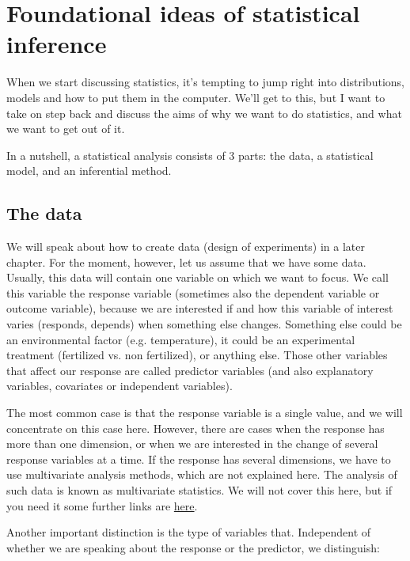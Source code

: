 \documentclass[a4paper,twoside]{tufte-book} %
\begin{document}
\chapter{Foundational ideas of statistical inference}

When we start discussing statistics, it's tempting to jump right into distributions, models and how to put them in the computer. We'll get to this, but I want to take on step back and discuss the aims of why we want to do statistics, and what we want to get out of it. 

In a nutshell, a statistical analysis consists of 3 parts: the data, a statistical model, and an inferential method. 

\section{The data}

We will speak about how to create data (design of experiments) in a later chapter. For the moment, however, let us assume that we have some data. Usually, this data will contain one variable on which we want to focus.  We call this variable the response variable (sometimes also the dependent variable or outcome variable), because we are interested if and how this variable of interest varies (responds, depends) when something else changes. Something else could be an environmental factor (e.g. temperature), it could be an experimental treatment (fertilized vs. non fertilized), or anything else.  Those other variables that affect our response are called predictor variables (and also explanatory variables, covariates or independent variables). 

The most common case is that the response variable is a single value, and we will concentrate on this case here. However, there are cases when the response has more than one dimension, or when we are interested in the change of several response variables at a time. {If the response has several dimensions, we have to use multivariate analysis methods, which are not explained here.} The analysis of such data is known as multivariate statistics. We will not cover this here, but if you need it some further links are \href{http://biometry.github.io/APES/Stats/stats50-MultivariateStatistics.html}{here}.

Another important distinction is the type of variables that. Independent of whether we are speaking about the response or the predictor, we distinguish: 
\end{document}
